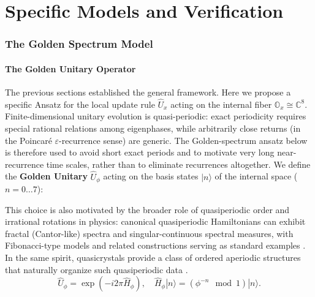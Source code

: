 \part{Specific Models and Verification}
\label{part:VI}

\section{The Golden Spectrum Model}
\label{chap:golden_spectrum}

\subsection{The Golden Unitary Operator}
The previous sections established the general framework. Here we propose a specific Ansatz for the local update rule $\hat{U}_x$ acting on the internal fiber $\mathbb{O}_x \cong \mathbb{C}^8$.
Finite-dimensional unitary evolution is quasi-periodic: exact periodicity requires special rational relations among eigenphases, while arbitrarily close returns (in the Poincar\'e $\varepsilon$-recurrence sense) are generic. The Golden-spectrum ansatz below is therefore used to avoid short exact periods and to motivate very long near-recurrence time scales, rather than to eliminate recurrences altogether. We define the \textbf{Golden Unitary} $\hat{U}_{\phi}$ acting on the basis states $|n\rangle$ of the internal space ($n=0 \dots 7$):
\par
This choice is also motivated by the broader role of quasiperiodic order and irrational rotations in physics: canonical quasiperiodic Hamiltonians can exhibit fractal (Cantor-like) spectra and singular-continuous spectral measures, with Fibonacci-type models and related constructions serving as standard examples \cite{Hofstadter1976,KohmotoKadanoffTang1983,Suto1987}. In the same spirit, quasicrystals provide a class of ordered aperiodic structures that naturally organize such quasiperiodic data \cite{LevineSteinhardt1984,Shechtman1984}.
\begin{equation}
    \hat{U}_{\phi} = \exp\left( -i 2\pi  \hat{H}_{\phi} \right), \quad \hat{H}_{\phi} |n\rangle = \left( \phi^{-n} \mod 1 \right) |n\rangle.
\end{equation}
